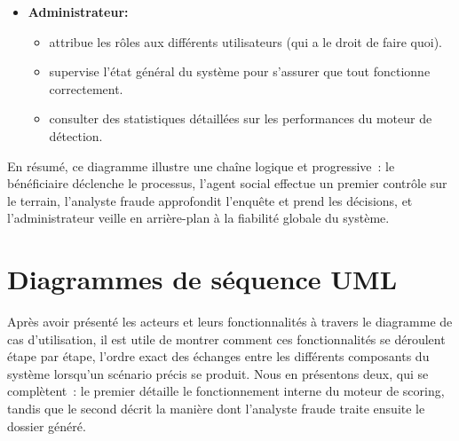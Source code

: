 \documentclass[a4paper, oneside, 12pt]{book}
\begin{document}
\begin{itemize}[label=\textbullet]
    \item \textbf{Administrateur: }
    \begin{itemize}[label=\textendash]
        \item attribue les rôles aux différents utilisateurs (qui a le droit de faire quoi).
        \item supervise l'état général du système pour s'assurer que tout fonctionne correctement.
        \item consulter des statistiques détaillées sur les performances du moteur de détection.

    \end{itemize}

\end{itemize}

\hspace{0.5cm}En résumé, ce diagramme illustre une chaîne logique et progressive~: le bénéficiaire déclenche le processus, l'agent social effectue un premier contrôle sur le terrain, l'analyste fraude approfondit l'enquête et prend les décisions, et l'administrateur veille en arrière-plan à la fiabilité globale du système.
\newpage



\section{Diagrammes de séquence UML}

\hspace{0.5cm}Après avoir présenté les acteurs et leurs fonctionnalités à travers le diagramme de cas d'utilisation, il est utile de montrer comment ces fonctionnalités se déroulent étape par étape, l'ordre exact des échanges entre les différents composants du système lorsqu'un scénario précis se produit. Nous en présentons deux, qui se complètent~: le premier détaille le fonctionnement interne du moteur de scoring, tandis que le second décrit la manière dont l'analyste fraude traite ensuite le dossier généré.
\end{document}
